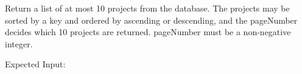\documentclass[letterpaper,10pt,english]{sphinxmanual}
\begin{document}
\begin{fulllineitems}
\begin{fulllineitems}
\end{fulllineitems}


\begin{fulllineitems}
\label{\detokenize{apidoc/utdesign_procurement:utdesign_procurement.apigateway.ApiGateway.projectData}}
Return a list of at most 10 projects from the database. The projects may be
sorted by a key and ordered by ascending or descending, and the pageNumber
decides which 10 projects are returned. pageNumber must be a non-negative integer.

Expected Input:


\end{fulllineitems}
\end{fulllineitems}
\end{document}
